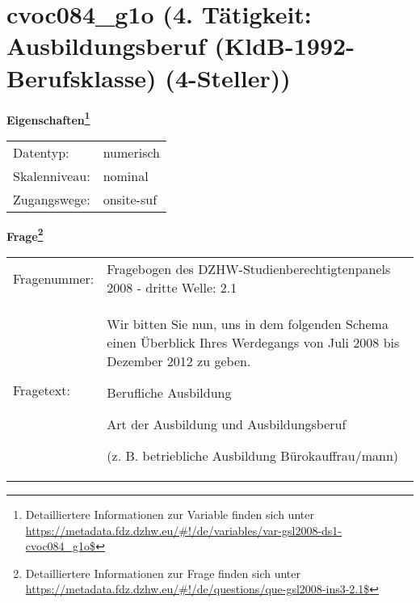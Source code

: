 
    \setcounter{footnote}{0}

    \vspace*{-1.8cm}
	\section{cvoc084\_g1o (4. Tätigkeit: Ausbildungsberuf (KldB-1992-Berufsklasse) (4-Steller))}
	\label{section:cvoc084_g1o}



    \vspace*{0.5cm}
    \noindent\textbf{Eigenschaften\footnote{Detailliertere Informationen zur Variable finden sich unter
		\url{https://metadata.fdz.dzhw.eu/\#!/de/variables/var-gsl2008-ds1-cvoc084_g1o$}}}\\
	\begin{tabularx}{\hsize}{@{}lX}
	Datentyp: & numerisch \\
	Skalenniveau: & nominal \\
	Zugangswege: &
	  onsite-suf
 \\
    \end{tabularx}



				\vspace*{0.5cm}
                \noindent\textbf{Frage\footnote{Detailliertere Informationen zur Frage finden sich unter
		              \url{https://metadata.fdz.dzhw.eu/\#!/de/questions/que-gsl2008-ins3-2.1$}}}\\
				\begin{tabularx}{\hsize}{@{}lX}
					Fragenummer: &
					  Fragebogen des DZHW-Studienberechtigtenpanels 2008 - dritte Welle:
					  2.1
 \\
					Fragetext: & Wir bitten Sie nun, uns in dem folgenden Schema einen Überblick Ihres Werdegangs von Juli 2008 bis Dezember 2012 zu geben.\par  Berufliche Ausbildung\par  Art der Ausbildung und Ausbildungsberuf\par  (z. B. betriebliche Ausbildung Bürokauffrau/mann) \\
				\end{tabularx}





